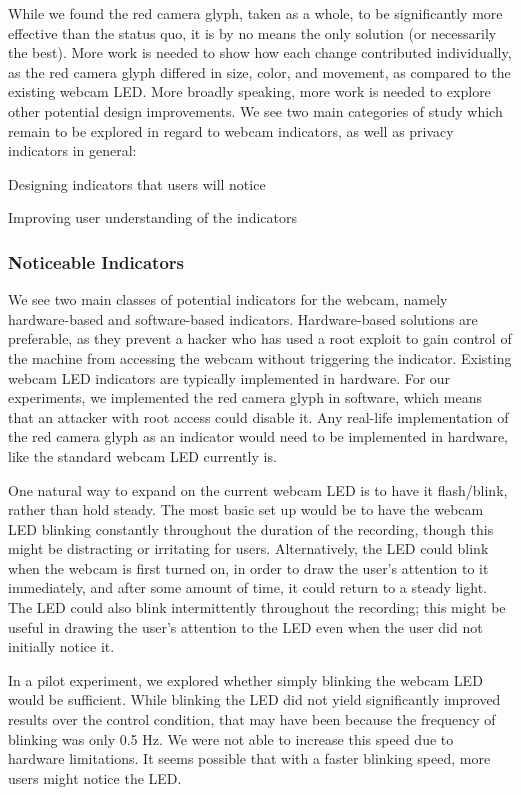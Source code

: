 \documentclass{sigchi}
\newenvironment{packed_enum}{
\begin{enumerate}
  \setlength{\itemsep}{1pt}
  \setlength{\parskip}{0pt}
  \setlength{\parsep}{0pt}
}{\end{enumerate}}
\begin{document}
While we found the red camera glyph, taken as a whole, to be significantly more effective than the status quo, it is by no means the only solution (or necessarily the best). More work is needed to show how each change contributed individually, as the red camera glyph differed in size, color, and movement, as compared to the existing webcam LED. More broadly speaking, more work is needed to explore other potential design improvements. We see two main categories of study which remain to be explored in regard to webcam indicators, as well as privacy indicators in general:

\begin{packed_enum}
\item Designing indicators that users will notice
\item Improving user understanding of the indicators
\end{packed_enum}

\subsubsection{Noticeable Indicators}

We see two main classes of potential indicators for the webcam, namely hardware-based and software-based indicators. Hardware-based solutions are preferable, as they prevent a hacker who has used a root exploit to gain control of the machine from accessing the webcam without triggering the indicator. Existing webcam LED indicators are typically implemented in hardware. For our experiments, we implemented the red camera glyph in software, which means that an attacker with root access could disable it. Any real-life implementation of the red camera glyph as an indicator would need to be implemented in hardware, like the standard webcam LED currently is.

One natural way to expand on the current webcam LED is to have it flash/blink, rather than hold steady. The most basic set up would be to have the webcam LED blinking constantly throughout the duration of the recording, though this might be distracting or irritating for users. Alternatively, the LED could blink when the webcam is first turned on, in order to draw the user's attention to it immediately, and after some amount of time, it could return to a steady light. The LED could also blink intermittently throughout the recording; this might be useful in drawing the user's attention to the LED even when the user did not initially notice it.

In a pilot experiment, we explored whether simply blinking the webcam LED would be sufficient. While blinking the LED did not yield significantly improved results over the control condition, %
that may have been because the frequency of blinking was only 0.5 Hz. We were not able to increase this speed due to hardware limitations. It seems possible that with a faster blinking speed, more users might notice the LED.
\end{document}
